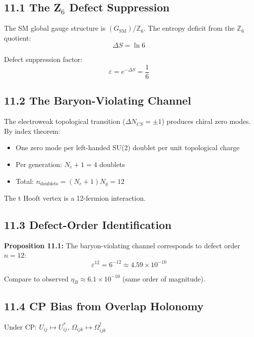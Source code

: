 \subsection{11.1 The Z$_6$ Defect Suppression}\label{111-the-zux2086-defect-suppression}

The SM global gauge structure is \((G_{\text{SM}})/\mathbb{Z}_6\). The entropy deficit from the \(\mathbb{Z}_6\) quotient: \[\Delta S = \ln 6\]

Defect suppression factor: \[\varepsilon = e^{-\Delta S} = \frac{1}{6}\]

\subsection{11.2 The Baryon-Violating Channel}\label{112-the-baryon-violating-channel}

The electroweak topological transition (\(\Delta N_{CS} = \pm 1\)) produces chiral zero modes. By index theorem:

\begin{itemize}
\tightlist
\item
  One zero mode per left-handed SU(2) doublet per unit topological charge
\item
  Per generation: \(N_c + 1 = 4\) doublets
\item
  Total: \(n_{\text{doublets}} = (N_c + 1)N_g = 12\)
\end{itemize}

The \textquotesingle t Hooft vertex is a 12-fermion interaction.

\subsection{11.3 Defect-Order Identification}\label{113-defect-order-identification}

\textbf{Proposition 11.1:} The baryon-violating channel corresponds to defect order \(n = 12\): \[\varepsilon^{12} = 6^{-12} \approx 4.59 \times 10^{-10}\]

Compare to observed \(\eta_B \approx 6.1 \times 10^{-10}\) (same order of magnitude).

\subsection{11.4 CP Bias from Overlap Holonomy}\label{114-cp-bias-from-overlap-holonomy}

Under CP: \(U_{ij} \mapsto U_{ij}^*\), \(\Omega_{ijk} \mapsto \Omega_{ijk}^\dagger\)

